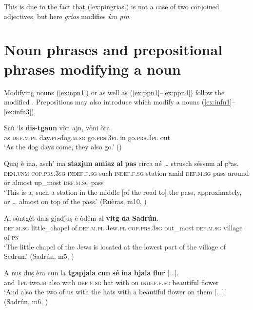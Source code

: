 This is due to the fact that (\ref{ex:pingrias}) is not a case of two conjoined adjectives, but here \textit{grias} modifies \textit{ùm pin}.

\section{Noun phrases and prepositional phrases modifying a noun}\label{sec:3.4}
Modifying nouns (\ref{ex:npn1}) or  as well as  (\ref{ex:ppn1}--\ref{ex:ppn4}) follow the modified .  Prepositions may also introduce  which modify a nouns (\ref{ex:infn1}--\ref{ex:infn3}).

\ea
\label{ex:npn1}
\gll  Scù `ls \textbf{dis}-\textbf{tgaun} vòn ajn, vòni òra.  \\
     as \textsc{def.m.pl} day.\textsc{pl}-dog.\textsc{m.sg} go.\textsc{prs.3pl} in go.\textsc{prs.3pl} out\\
\glt `As the dog days come, they also go.' ()
\z

\ea\label{ex:ppn1}
\gll Quaj è ina, asch’ ina \textbf{stazjun} \textbf{amiaz} \textbf{al} \textbf{pas} circa né … strusch séssum al pʰas.\\
\textsc{dem.unm} \textsc{cop.prs.3sg} \textsc{indef.f.sg} such \textsc{indef.f.sg} station amid \textsc{def.m.sg} pass around or {} almost up\_most \textsc{def.m.sg} pass\\
\glt `This is a, such a station in the middle [of the road to] the pass, approximately, or … almost on top of the pass.' (Ruèras, m10, )
\z

\ea\label{ex:ppn2}
\gll Al sòntg{\`e̱}t dals gjadjuṣ è òdém al \textbf{vitg} \textbf{da} \textbf{Sadrún}.\\
\textsc{def.m.sg} little\_chapel of.\textsc{def.m.pl} Jew.\textsc{pl} \textsc{cop.prs.3sg}  out\_most \textsc{def.m.sg} village of \textsc{pn} \\
\glt `The little chapel of the Jews is located at the lowest part of the village of Sedrun.' (Sadrún, m5, )
\z

\ea\label{ex:ppn3}
\gll    A nuṣ duṣ èra cun la \textbf{tgapjala} \textbf{cun} \textbf{sé} \textbf{ina} \textbf{bjala} \textbf{flur} [...].\\
and \textsc{1pl} two.\textsc{m} also with \textsc{def.f.sg} hat with on \textsc{indef.f.sg} beautiful flower\\
\glt `And also the two of us with the hats with a beautiful flower on them [...].' (Sadrún, m6, )
\z


